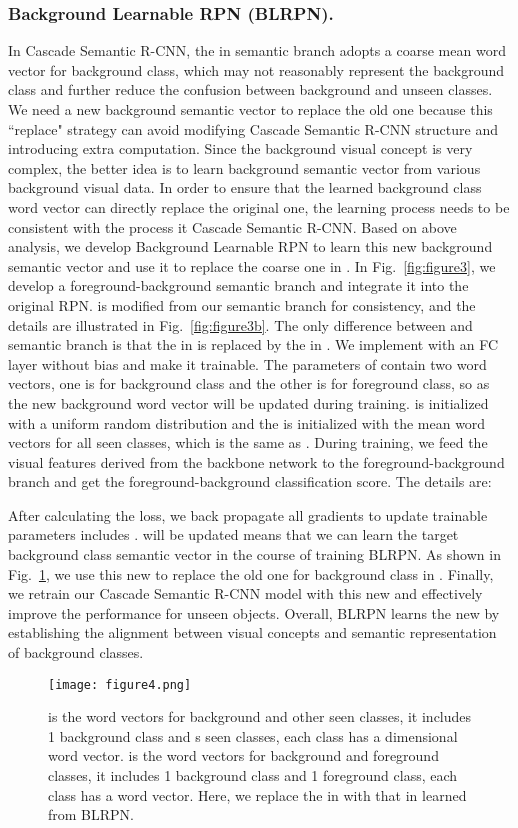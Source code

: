 \documentclass[runningheads]{llncs}
\begin{document}
\subsubsection{Background Learnable RPN (BLRPN). \label{BLRPN}}
In Cascade Semantic R-CNN, the  in semantic branch adopts a coarse mean word vector  for background class, which may not reasonably represent the background class and further reduce the confusion between background and unseen classes. We need a new background semantic vector to replace the old one because this ``replace" strategy can avoid modifying Cascade Semantic R-CNN structure and introducing extra computation. Since the background visual concept is very complex, the better idea is to learn background semantic vector from various background visual data. In order to ensure that the learned background class word vector can directly replace the original one, the learning process needs to be consistent with the process it Cascade Semantic R-CNN.
Based on above analysis, we develop Background Learnable RPN to learn this new background semantic vector and use it to replace the coarse one in . In Fig.~\ref{fig:figure3}, we develop a foreground-background semantic branch  and integrate it into the original RPN.  is modified from our semantic branch for consistency, and the details are illustrated in Fig.~\ref{fig:figure3b}. The only difference between  and semantic branch  is that the  in  is replaced by the  in . We implement  with an FC layer without bias and make it trainable. The parameters of  contain two word vectors, one is  for background class and the other is  for foreground class, so  as the new background word vector will be updated during training.  is initialized with a uniform random distribution and the  is initialized with the mean word vectors for all seen classes, which is the same as . During training, we feed the visual features derived from the backbone network to the foreground-background branch and get the foreground-background classification score. The details are:

After calculating the loss, we back propagate all gradients to update trainable parameters includes .  will be updated means that we can learn the target background class semantic vector  in the course of training BLRPN. As shown in Fig.~\ref{fig:figure4}, we use this new  to replace the old one for background class in . Finally, we retrain our Cascade Semantic R-CNN model with this new  and effectively improve the performance for unseen objects. Overall, BLRPN learns the new  by establishing the alignment between visual concepts and semantic representation of background classes.
\begin{figure}[tbp]
\centering
\texttt{[image: figure4.png]}
\caption{ is the word vectors for background and other seen classes, it includes 1 background class and s seen classes, each class has a   dimensional word vector.  is the word vectors for background and foreground classes, it includes 1 background class and 1 foreground class, each class has a  word vector. Here, we replace the  in  with that in  learned from BLRPN.}
\label{fig:figure4}
\end{figure}
\end{document}
